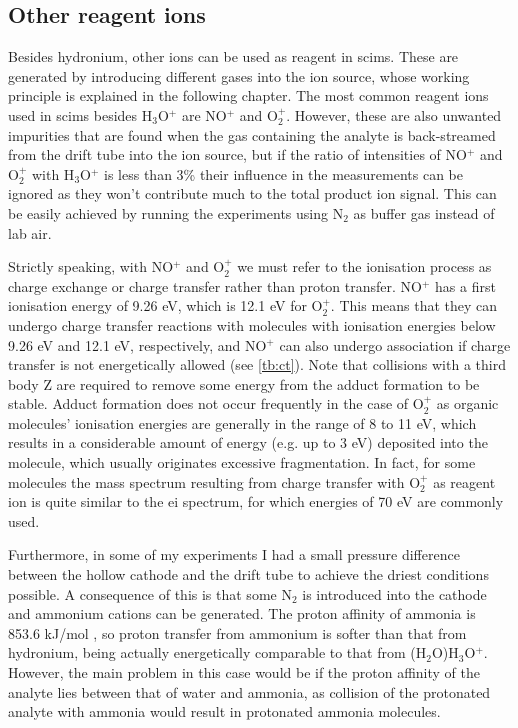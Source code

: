 \subsection{Other reagent ions} %
Besides hydronium, other ions can be used as reagent in \acrshort{scims}.
%
These are generated by introducing different gases into the ion source, whose working principle is explained in the following chapter.
%
The most common reagent ions used in \acrshort{scims} besides H$_3$O$^+$ are NO$^+$ and O$_2^+$.
%
However, these are also unwanted impurities that are found when the gas containing the analyte  is back-streamed from the drift tube into the ion source, but if the ratio of intensities of NO$^+$ and O$_2^+$ with H$_3$O$^+$ is less than 3\% their influence in the measurements can be ignored as they won't contribute much to the total product ion signal. This can be easily achieved by running the experiments using N$_2$ as buffer gas instead of lab air.






Strictly speaking, with NO$^+$ and O$_2^+$ we must refer to the ionisation process as charge exchange or charge transfer rather than proton transfer. NO$^+$ has a first ionisation energy of 9.26 eV, which is 12.1 eV for O$_2^+$. This means that they can undergo charge transfer reactions with molecules with ionisation energies below 9.26 eV and 12.1 eV, respectively, and NO$^+$ can also undergo association  if charge transfer is not energetically allowed (see \autoref{tb:ct}). Note that collisions with a third body  Z   are required to remove some energy from the adduct formation to be stable. Adduct formation does not occur frequently in the case of O$_2^+$ as organic molecules' ionisation energies are generally in the range of 8 to 11 eV, which results in a considerable amount of energy (e.g. up to 3 eV) deposited into the molecule, which usually originates excessive fragmentation. In fact, for some molecules the mass spectrum resulting from charge transfer with O$_2^+$ as reagent ion is quite similar to the \acrshort{ei} spectrum, for which energies of 70 eV are commonly used.

Furthermore, in some of my experiments I had a small pressure difference between the hollow cathode and the drift tube to achieve the driest conditions possible. A consequence of this is that some N$_2$ is introduced into the cathode and ammonium cations can be generated. The proton affinity of ammonia is 853.6 kJ/mol \cite{doi:10.1063/1.556018}, so proton transfer from ammonium is softer than that from hydronium, being actually energetically comparable to that from (H$_2$O)H$_3$O$^+$. However, the main problem in this case would be if the proton affinity of the analyte lies between that of water and ammonia, as collision of the protonated analyte with ammonia would result in protonated ammonia molecules.

